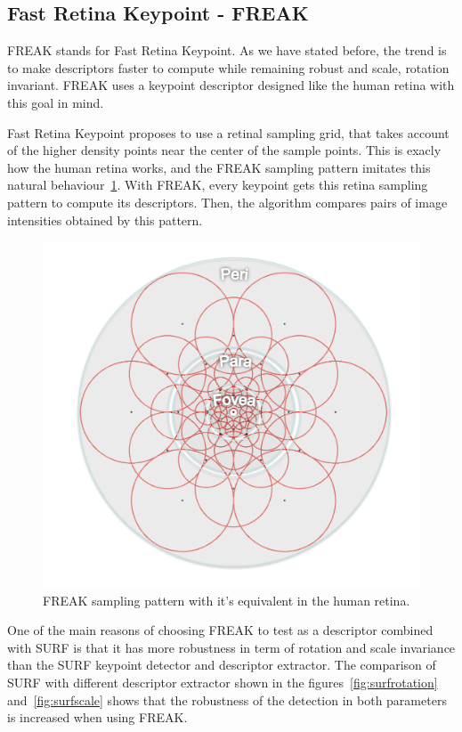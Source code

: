 \subsection{Fast Retina Keypoint - FREAK}
FREAK stands for Fast Retina Keypoint\cite{Ortiz:2012:FFR:2354409.2354903}. As we
have stated before, the trend is to make descriptors faster to compute while
remaining robust and scale, rotation invariant. FREAK uses a keypoint descriptor
designed like the human retina with this goal in mind.

Fast Retina Keypoint proposes to use a retinal sampling grid, that takes account of
the higher density points near the center of the sample points. This is exacly how
the human retina works, and the FREAK sampling pattern imitates this natural
behaviour~\ref{fig:freak}. With FREAK, every keypoint gets this retina sampling
pattern to compute its descriptors. Then, the algorithm compares pairs of image
intensities obtained by this pattern.

\begin{figure}
\centering
\includegraphics[scale=0.55]{img/freak.png}
\caption{\label{fig:freak}FREAK sampling pattern with it's equivalent in the human
  retina.} 
\end{figure} 

One of the main reasons of choosing FREAK to test as a descriptor combined with
SURF is that it has more robustness in term of rotation and scale
invariance than the SURF keypoint detector and descriptor extractor. The
comparison of SURF with different descriptor 
extractor\cite{rotationscaleinv} shown in the figures~\ref{fig:surfrotation}
and~\ref{fig:surfscale}
shows that the robustness of the detection in both parameters is increased when
using FREAK. 

